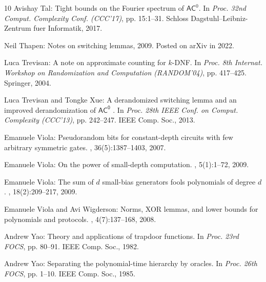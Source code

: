\documentclass[11pt]{article}
\numberwithin{equation}{section}
\theoremstyle{definition}
\theoremstyle{plain}
\theoremstyle{plain}
\begin{document}
\begin{thebibliography}{10}
{\sc Avishay Tal}: Tight bounds on the {F}ourier spectrum of {$\mathsf{AC}^0$}.
\newblock In {\em Proc. 32nd Comput. Complexity Conf. (CCC'17)}, pp. 15:1--31.
  Schloss Dagstuhl--Leibniz-Zentrum fuer Informatik, 2017.

{\sc Neil Thapen}: Notes on switching lemmas, 2009.
\newblock Posted on arXiv in 2022.

{\sc Luca Trevisan}: A note on approximate counting for {$k$-DNF}.
\newblock In {\em Proc. 8th Internat. Workshop on Randomization and Computation
  (RANDOM'04)}, pp. 417--425. Springer, 2004.
\newblock [\epfmtdoi{10.1007/978-3-540-27821-4\_37}]

{\sc Luca Trevisan and Tongke Xue}: A derandomized switching lemma and an
  improved derandomization of {{$\mathsf{AC^0}$ }}.
\newblock In {\em Proc. 28th IEEE Conf. on Comput. Complexity (CCC'13)}, pp.
  242--247. IEEE Comp. Soc., 2013.

{\sc Emanuele Viola}: Pseudorandom bits for constant-depth circuits with few
  arbitrary symmetric gates.
, 36(5):1387--1403, 2007.
\newblock [\epfmtdoi{10.1137/050640941}]

{\sc Emanuele Viola}: On the power of small-depth computation.
, 5(1):1--72, 2009.
\newblock [\epfmtdoi{10.1561/0400000033}]

{\sc Emanuele Viola}: The sum of {$d$} small-bias generators fools polynomials
  of degree {$d$}.
, 18(2):209--217, 2009.
\newblock [\epfmtdoi{10.1007/s00037-009-0273-5}]

{\sc Emanuele Viola and Avi Wigderson}: Norms, {XOR} lemmas, and lower bounds
  for polynomials and protocols.
, 4(7):137--168, 2008.

{\sc Andrew Yao}: Theory and applications of trapdoor functions.
\newblock In {\em Proc. 23rd FOCS}, pp. 80--91. IEEE Comp. Soc., 1982.

{\sc Andrew Yao}: Separating the polynomial-time hierarchy by oracles.
\newblock In {\em Proc. 26th FOCS}, pp. 1--10. IEEE Comp. Soc., 1985.

\end{thebibliography}
\end{document}
